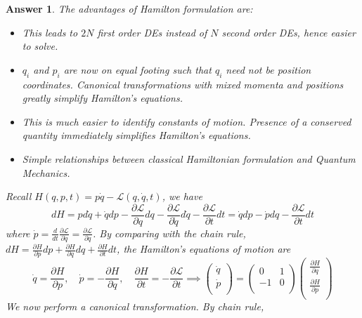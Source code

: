 \documentclass[a4paper]{article}
\newtheorem{ans}{Answer}[section]
\theoremstyle{new}
\begin{document}
\begin{ans}
The advantages of Hamilton formulation are:
\begin{itemize}
    \item This leads to $2N$ first order DEs instead of $N$ second order DEs, hence easier to solve.
    \item $q_i$ and $p_i$ are now on equal footing such that $q_i$ need not be position coordinates. Canonical transformations with mixed momenta and positions greatly simplify Hamilton's equations.
    \item This is much easier to identify constants of motion. Presence of a conserved quantity immediately simplifies Hamilton's equations.
    \item Simple relationships between classical Hamiltonian formulation and Quantum Mechanics. 
\end{itemize}
Recall $H(q,p,t)=p\dot{q}-\mathcal{L}(q,\dot{q},t)$, we have
$$dH=pd\dot{q}+\dot{q}dp-\frac{\partial\mathcal{L}}{\partial q}dq-\frac{\partial\mathcal{L}}{\partial\dot{q}}d\dot{q}-\frac{\partial\mathcal{L}}{\partial t}dt=\dot{q}dp-\dot{p}dq-\frac{\partial\mathcal{L}}{\partial t}dt$$
where $\dot{p}=\frac{d}{dt}\frac{\partial\mathcal{L}}{\partial\dot{q}}=\frac{\partial\mathcal{L}}{\partial q}$. By comparing with the chain rule, $dH=\frac{\partial H}{\partial p}dp+\frac{\partial H}{\partial q}dq+\frac{\partial H}{\partial t}dt$, the Hamilton's equations of motion are
$$\dot{q}=\frac{\partial H}{\partial p},\quad\dot{p}=-\frac{\partial H}{\partial q},\quad\frac{\partial H}{\partial t}=-\frac{\partial\mathcal{L}}{\partial t}\implies\begin{pmatrix}\dot{q}\\\dot{p}\\\end{pmatrix}=\begin{pmatrix}0&1\\-1&0\\\end{pmatrix}\begin{pmatrix}\frac{\partial H}{\partial q}\\\frac{\partial H}{\partial p}\\\end{pmatrix}$$
We now perform a canonical transformation. By chain rule,

\end{ans}
\end{document}
